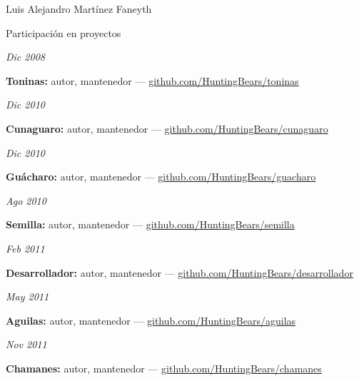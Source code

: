 \documentclass[11pt,letterpaper]{article}
\begin{document}
\begin{cv}{Luis Alejandro Mart\'inez Faneyth}
\begin{cvlist}{Participaci\'on en proyectos}
\item[{\parbox[t]{6em}{\textit{\large{Dic 2008}}}}]{
	\parbox[t]{\linewidth}{
		\textbf{Toninas:} autor, mantenedor --- \href{http://github.com/HuntingBears/toninas}{github.com/HuntingBears/toninas}
	}
}
\item[{\parbox[t]{6em}{\textit{\large{Dic 2010}}}}]{
	\parbox[t]{\linewidth}{
		\textbf{Cunaguaro:} autor, mantenedor --- \href{http://github.com/HuntingBears/cunaguaro}{github.com/HuntingBears/cunaguaro}
	}
}
\item[{\parbox[t]{6em}{\textit{\large{Dic 2010}}}}]{
	\parbox[t]{\linewidth}{
		\textbf{Gu\'acharo:} autor, mantenedor --- \href{http://github.com/HuntingBears/guacharo}{github.com/HuntingBears/guacharo}
	}
}
\item[{\parbox[t]{6em}{\textit{\large{Ago 2010}}}}]{
	\parbox[t]{\linewidth}{
		\textbf{Semilla:} autor, mantenedor --- \href{http://github.com/HuntingBears/semilla}{github.com/HuntingBears/semilla}
	}
}
\item[{\parbox[t]{6em}{\textit{\large{Feb 2011}}}}]{
	\parbox[t]{\linewidth}{
		\textbf{Desarrollador:} autor, mantenedor --- \href{http://github.com/HuntingBears/desarrollador}{github.com/HuntingBears/desarrollador}
	}
}
\item[{\parbox[t]{6em}{\textit{\large{May 2011}}}}]{
	\parbox[t]{\linewidth}{
		\textbf{Aguilas:} autor, mantenedor --- \href{http://github.com/HuntingBears/aguilas}{github.com/HuntingBears/aguilas}
	}
}
\item[{\parbox[t]{6em}{\textit{\large{Nov 2011}}}}]{
	\parbox[t]{\linewidth}{
		\textbf{Chamanes:} autor, mantenedor --- \href{http://github.com/HuntingBears/chamanes}{github.com/HuntingBears/chamanes}
	}
}
\end{cvlist}


\end{cv}
\end{document}
